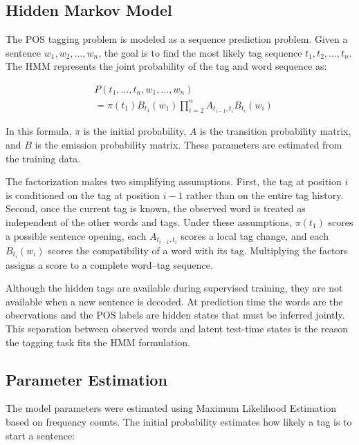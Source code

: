\documentclass[12pt,a4paper]{article}
\newcommand{\subsectionbreakguard}{\Needspace{7\baselineskip}}
\begin{document}
\subsectionbreakguard
\subsection{Hidden Markov Model}

The POS tagging problem is modeled as a sequence prediction problem. Given a
sentence $w_1, w_2, \ldots, w_n$, the goal is to find the most likely tag sequence
$t_1, t_2, \ldots, t_n$. The HMM represents the joint probability of the tag and
word sequence as:

\begin{equation}
\begin{aligned}
&P(t_1, \ldots, t_n, w_1, \ldots, w_n) \\
&= \pi(t_1) B_{t_1}(w_1)
\prod_{i=2}^{n} A_{t_{i-1},t_i} B_{t_i}(w_i)
\end{aligned}
\end{equation}

In this formula, $\pi$ is the initial probability, $A$ is the transition
probability matrix, and $B$ is the emission probability matrix. These parameters
are estimated from the training data.

The factorization makes two simplifying assumptions. First, the tag at position
$i$ is conditioned on the tag at position $i-1$ rather than on the entire tag
history. Second, once the current tag is known, the observed word is treated as
independent of the other words and tags. Under these assumptions, $\pi(t_1)$
scores a possible sentence opening, each $A_{t_{i-1},t_i}$ scores a local tag
change, and each $B_{t_i}(w_i)$ scores the compatibility of a word with its tag.
Multiplying the factors assigns a score to a complete word--tag sequence.

Although the hidden tags are available during supervised training, they are not
available when a new sentence is decoded. At prediction time the words are the
observations and the POS labels are hidden states that must be inferred jointly.
This separation between observed words and latent test-time states is the reason
the tagging task fits the HMM formulation.

\subsectionbreakguard
\subsection{Parameter Estimation}

The model parameters were estimated using Maximum Likelihood Estimation based on
frequency counts. The initial probability estimates how likely a tag is to start
a sentence:
\end{document}
